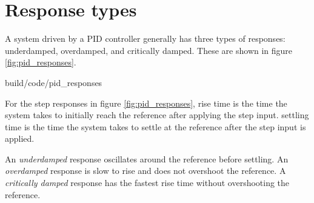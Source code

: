 \section{Response types}

A \gls{system} driven by a PID controller generally has three types of
responses: underdamped, overdamped, and critically damped. These are shown in
figure \ref{fig:pid_responses}.

\begin{svg}{build/code/pid_responses}
  \caption{PID controller response types}
  \label{fig:pid_responses}
\end{svg}

For the \glspl{step response} in figure \ref{fig:pid_responses}, \gls{rise time}
is the time the \gls{system} takes to initially reach the \gls{reference} after
applying the \gls{step input}. \Gls{settling time} is the time the \gls{system}
takes to settle at the \gls{reference} after the \gls{step input} is applied.

An \textit{underdamped} response oscillates around the \gls{reference} before
settling. An \textit{overdamped} response is slow to rise and does not overshoot
the \gls{reference}. A \textit{critically damped} response has the fastest
\gls{rise time} without overshooting the \gls{reference}.
